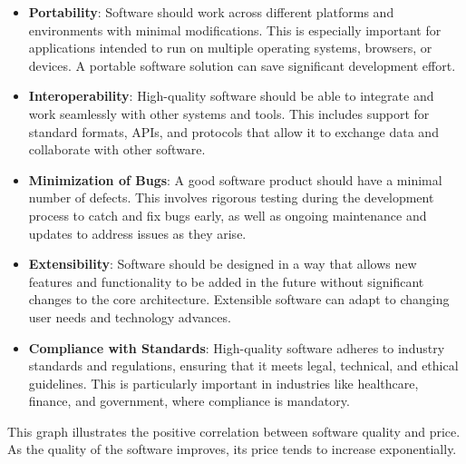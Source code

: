 \begin{itemize}
\item \textbf{Portability}:  
Software should work across different platforms and environments with minimal modifications. This is especially important for applications intended to run on multiple operating systems, browsers, or devices. A portable software solution can save significant development effort.

\item \textbf{Interoperability}:  
High-quality software should be able to integrate and work seamlessly with other systems and tools. This includes support for standard formats, APIs, and protocols that allow it to exchange data and collaborate with other software.

\item \textbf{Minimization of Bugs}:  
A good software product should have a minimal number of defects. This involves rigorous testing during the development process to catch and fix bugs early, as well as ongoing maintenance and updates to address issues as they arise.

\item \textbf{Extensibility}:  
Software should be designed in a way that allows new features and functionality to be added in the future without significant changes to the core architecture. Extensible software can adapt to changing user needs and technology advances.

\item \textbf{Compliance with Standards}:  
High-quality software adheres to industry standards and regulations, ensuring that it meets legal, technical, and ethical guidelines. This is particularly important in industries like healthcare, finance, and government, where compliance is mandatory.
\end{itemize}

\vspace{0.5cm}


This graph illustrates the positive correlation between software quality and price. As the quality of the software improves, its price tends to increase exponentially.

